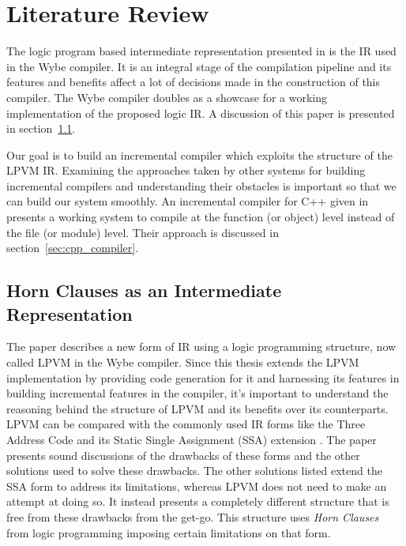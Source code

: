 \chapter{Literature Review}


The logic program based intermediate representation presented in
\cite{lpvm2015} is the IR used in the Wybe compiler. It is an integral stage of
the compilation pipeline and its features and benefits affect a lot of
decisions made in the construction of this compiler. The Wybe compiler doubles
as a showcase for a working implementation of the proposed logic IR. A
discussion of this paper is presented in section~\ref{sec:horn_clauses}.

Our goal is to build an incremental compiler which exploits the structure of
the LPVM IR. Examining the approaches taken by other systems for building
incremental compilers and understanding their obstacles is important so that we
can build our system smoothly. An incremental compiler for C++ given in
\cite{cpp_compiler} presents a working system to compile at the function (or
object) level instead of the file (or module) level. Their approach is
discussed in section~\ref{sec:cpp_compiler}.


\section{Horn Clauses as an Intermediate Representation \citep{lpvm2015}}
\label{sec:horn_clauses}


The paper describes a new form of IR using a logic programming structure, now
called LPVM in the Wybe compiler. Since this thesis extends the LPVM
implementation by providing code generation for it and harnessing its features
in building incremental features in the compiler, it's important to understand
the reasoning behind the structure of LPVM and its benefits over its
counterparts. LPVM can be compared with the commonly used IR forms like the
Three Address Code and its Static Single Assignment (SSA) extension
\citep{alpernSSA}. The paper presents sound discussions of the drawbacks of
these forms and the other solutions used to solve these drawbacks. The other
solutions listed extend the SSA form to address its limitations, whereas LPVM
does not need to make an attempt at doing so. It instead presents a completely
different structure that is free from these drawbacks from the get-go. This
structure uses \textit{Horn Clauses} from logic programming imposing certain limitations
on that form.

